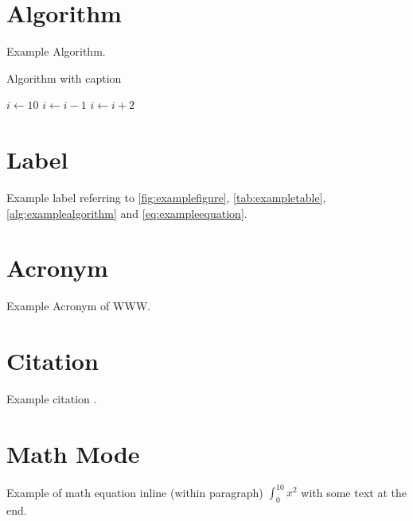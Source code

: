 \section{Algorithm}

Example Algorithm.

\begin{algorithm}
  \centering
  \caption{Algorithm with caption}
  \label{alg:examplealgorithm}
  \begin{algorithmic}
  \State $i \gets 10$
    \State $i \gets i-1$
  \Else
      \State $i \gets i+2$
    \EndIf
  \EndIf
  \end{algorithmic}
\end{algorithm}

\section{Label}

Example label referring to \autoref{fig:examplefigure}, \autoref{tab:exampletable},
\autoref{alg:examplealgorithm} and \autoref{eq:exampleequation}.

\section{Acronym}
Example Acronym of \ac{WWW}.

\section{Citation}

Example citation \cite{shannon1949communication}.

\section{Math Mode}


Example of math equation inline (within paragraph) $ \int_{0}^{10} x^2 $ with some text at the end.

